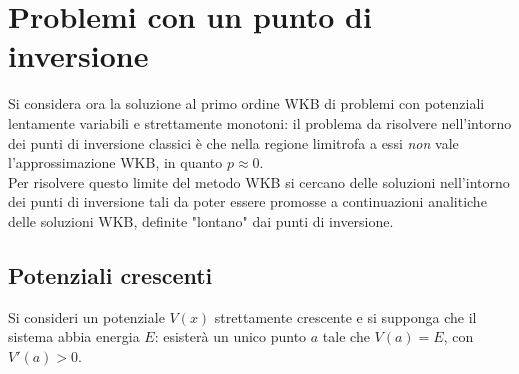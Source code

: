 \section{Problemi con un punto di inversione}
Si considera ora la soluzione al primo ordine WKB di problemi con potenziali lentamente variabili e
strettamente monotoni: il problema da risolvere nell'intorno dei punti di inversione classici è che
nella regione limitrofa a essi \textit{non} vale l'approssimazione WKB, in quanto $p\approx0$.\\
Per risolvere questo limite del metodo WKB si cercano delle soluzioni nell'intorno dei punti
di inversione tali da poter essere promosse a continuazioni analitiche delle soluzioni WKB, definite
"lontano" dai punti di inversione.
\subsection{Potenziali crescenti}
Si consideri un potenziale $V(x)$ strettamente crescente e si supponga che il sistema abbia energia
$E$: esisterà un unico punto $a$ tale che $V(a)=E$, con $V'(a)>0$.

